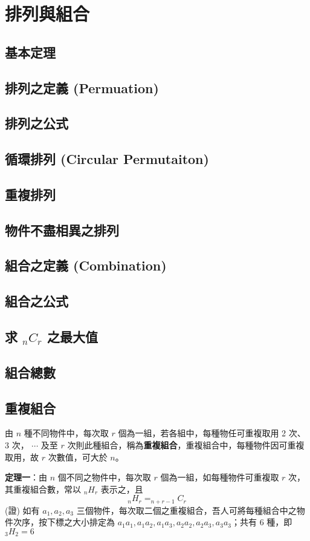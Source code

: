 \chapter{排列與組合}
\section{基本定理}
\section{排列之定義 (Permuation)}
\section{排列之公式}
\section{循環排列 (Circular Permutaiton)}
\section{重複排列}
\section{物件不盡相異之排列}
\section{組合之定義 (Combination)}
\section{組合之公式}
\section{求 $_nC_r$ 之最大值}
\section{組合總數}
\section{重複組合}
由 $n$ 種不同物件中，每次取 $r$ 個為一組，若各組中，每種物任可重複取用 2 次、3 次， $\cdots$ 及至 $r$ 次則此種組合，稱為\textbf{重複組合}，重複組合中，每種物件因可重複取用，故 $r$ 次數值，可大於 $n$。

\textbf{定理一}：由 $n$ 個不同之物件中，每次取 $r$ 個為一組，如每種物件可重複取 $r$ 次，其重複組合數，常以 $_nH_r$ 表示之，且
\begin{equation*}
_nH_r=_{n+r-1}C_r
\end{equation*}
(證) 如有 $a_1,a_2,a_3$ 三個物件，每次取二個之重複組合，吾人可將每種組合中之物件次序，按下標之大小排定為 $a_1a_1,a_1a_2,a_1a_3,a_2a_2,a_2a_3,a_3a_3$；共有 6 種，即 $_3H_2=6$

